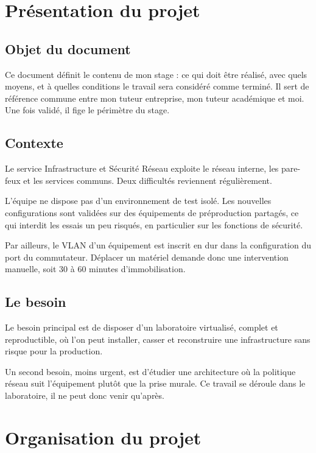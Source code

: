 \documentclass[11pt,a4paper]{article}
\begin{document}
\section{Présentation du projet}

\subsection{Objet du document}
Ce document définit le contenu de mon stage : ce qui doit être réalisé, avec quels moyens, et à quelles conditions le travail sera considéré comme terminé. Il sert de référence commune entre mon tuteur entreprise, mon tuteur académique et moi. Une fois validé, il fige le périmètre du stage.

\subsection{Contexte}
Le service Infrastructure et Sécurité Réseau exploite le réseau interne, les pare-feux et les services communs. Deux difficultés reviennent régulièrement.

L'équipe ne dispose pas d'un environnement de test isolé. Les nouvelles configurations sont validées sur des équipements de préproduction partagés, ce qui interdit les essais un peu risqués, en particulier sur les fonctions de sécurité.

Par ailleurs, le VLAN d'un équipement est inscrit en dur dans la configuration du port du commutateur. Déplacer un matériel demande donc une intervention manuelle, soit 30 à 60 minutes d'immobilisation.

\subsection{Le besoin}
Le besoin principal est de disposer d'un laboratoire virtualisé, complet et reproductible, où l'on peut installer, casser et reconstruire une infrastructure sans risque pour la production.

Un second besoin, moins urgent, est d'étudier une architecture où la politique réseau suit l'équipement plutôt que la prise murale. Ce travail se déroule dans le laboratoire, il ne peut donc venir qu'après.

\section{Organisation du projet}
\end{document}
